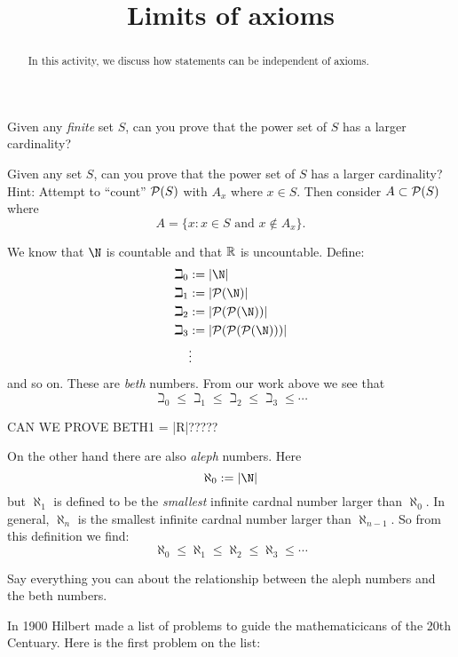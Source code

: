 \documentclass{ximera}
\title{Limits of axioms}
\begin{document}
\begin{abstract}
In this activity, we discuss how statements can be independent of axioms.
\end{abstract}
\maketitle 



\begin{question}
Given any \textit{finite} set $S$, can you prove that the power set of
$S$ has a larger cardinality?
\end{question}

\begin{question}
Given any set $S$, can you prove that the power set of $S$ has a
larger cardinality? Hint: Attempt to ``count'' $\P(S)$ with $A_x$
where $x\in S$. Then consider $A \subset \P(S)$ where
\[
A = \{x : x \in S\text{ and } x\not\in A_x\}.
\]
\end{question}



We know that $\N$ is countable and that $\R$ is uncountable. Define:
\begin{align*}
\beth_0 &:=|\N|\\
\beth_1 &:=|\P(\N)|\\
\beth_2 &:=|\P(\P(\N))|\\
\beth_3 &:=|\P(\P(\P(\N)))|\\
        &\vdots
\end{align*}
and so on. These are \textit{beth} numbers. From our work above we see that 
\[
\beth_0 \le \beth_1 \le \beth_2 \le \beth_3 \le \cdots
\]


CAN WE PROVE BETH1 = |R|?????


On the other hand there are also \textit{aleph} numbers. Here
\[
\aleph_0 := |\N|
\]
but $\aleph_1$ is defined to be the \textit{smallest} infinite cardnal
number larger than $\aleph_0$. In general, $\aleph_n$ is the smallest
infinite cardnal number larger than $\aleph_{n-1}$. So from this
definition we find:
\[
\aleph_0 \le \aleph_1 \le \aleph_2 \le \aleph_3 \le \cdots
\]

\begin{question}
Say everything you can about the relationship between the aleph
numbers and the beth numbers.
\end{question}


In 1900 Hilbert made a list of problems to guide the mathematicicans
of the 20th Centuary. Here is the first problem on the list:
\end{document}
